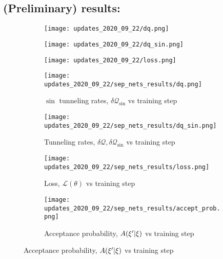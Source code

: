 %
\subsection{(Preliminary) results:}
\begin{figure}[htpb]
  \centering
  \begin{subfigure}{0.3\textwidth}
    \texttt{[image: updates\_2020\_09\_22/dq.png]}
  \end{subfigure}%
  \begin{subfigure}{0.3\textwidth}
  \texttt{[image: updates\_2020\_09\_22/dq\_sin.png]}
  \end{subfigure}%
  \begin{subfigure}{0.3\textwidth}
  \texttt{[image: updates\_2020\_09\_22/loss.png]}
  \end{subfigure}%
\end{figure}
%
\begin{figure}[htpb]
  \centering
  \begin{subfigure}[htpb]{0.675\textwidth}
    \texttt{[image: updates\_2020\_09\_22/sep\_nets\_results/dq.png]}
    \caption{\(\sin\) tunneling rates, \(\delta\mathcal{Q}_{\sin}\) vs training step}
  \end{subfigure}
  \begin{subfigure}[htpb]{0.675\textwidth}
    \texttt{[image: updates\_2020\_09\_22/sep\_nets\_results/dq\_sin.png]}
    \caption{Tunneling rates, \(\delta \mathcal{Q}, \delta\mathcal{Q}_{\sin}\)
    vs training step}
  \end{subfigure}
%
  \begin{subfigure}[htpb]{0.675\textwidth}
    \texttt{[image: updates\_2020\_09\_22/sep\_nets\_results/loss.png]}
    \caption{Loss, \(\mathcal{L}(\theta)\) vs training step} 
  \end{subfigure}
%
  \begin{subfigure}[htpb]{0.675\textwidth}
    \texttt{[image: updates\_2020\_09\_22/sep\_nets\_results/accept\_prob.png]}
    \caption{Acceptance probability, \(A({\xi^{\prime}}|\xi)\) vs training step} 
  \end{subfigure}
\end{figure}
%
%
